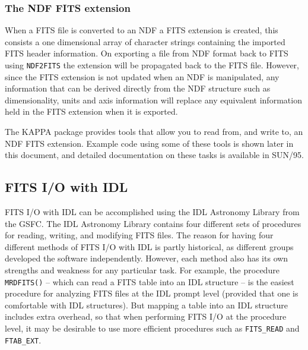 \documentclass[twoside,11pt]{article}
\newcommand{\htmladdnormallink}[2]{#1}
\newcommand{\htmlref}[2]{#1}
\newcommand{\xref}[3]{#1}
\newcommand{\xlabel}[1]{}
\begin{document}
\subsubsection{The NDF FITS extension}

When a FITS file is converted to an NDF a FITS extension is created, this consists a one dimensional array of character strings containing the imported FITS header information. On exporting a file from NDF format back to FITS using \xref{{\tt NDF2FITS}}{sun55}{NDF2FITS} the extension will be propagated back to the FITS file. However, since the FITS extension is not updated when an NDF is manipulated, any information that can be derived directly from the NDF structure such as dimensionality, units and axis information will replace any equivalent information held in the FITS extension when it is exported.

The KAPPA package provides tools that allow you to read from, and write to, an NDF FITS extension. Example code using some of these tools is shown later in this \htmlref{document}{sc16_fitsheader}, and detailed documentation on these tasks is available in \xref{SUN/95}{sun95}{se_fitsairlock}.

\subsection{\xlabel{sc16_fitsidl}FITS I/O with IDL\label{sc16_fitsidl}}

\htmladdnormallink{FITS I/O}{http://idlastro.gsfc.nasa.gov/fitsio.html} with IDL can be accomplished using the \htmladdnormallink{IDL Astronomy Library}{http://idlastro.gsfc.nasa.gov/homepage.html} from the GSFC. The IDL Astronomy Library contains four different sets of procedures for reading, writing, and modifying FITS files. The reason for having four different methods of FITS I/O with IDL is partly historical, as different groups developed the software independently. However, each method also has its own strengths and weakness for any particular task. For example, the procedure {\tt MRDFITS()} -- which can read a FITS table into an IDL structure -- is the easiest procedure for analyzing FITS files at the IDL prompt level (provided that one is comfortable with IDL structures). But mapping a table into an IDL structure includes extra overhead, so that when performing FITS I/O at the procedure level, it may be desirable to use more efficient procedures such as {\tt FITS\_READ} and {\tt FTAB\_EXT}. 
\end{document}
